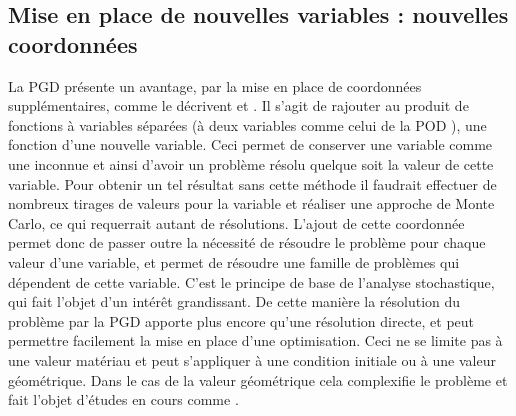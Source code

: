 \documentclass[12pt,a4paper]{report}
\begin{document}
\subsection{Mise en place de nouvelles variables : nouvelles coordonnées}
La PGD présente un avantage, par la mise en place de coordonnées supplémentaires, comme le décrivent \cite{Paradigm} et \cite{DDAS}. Il s'agit de rajouter au produit de fonctions à variables séparées (à deux variables comme celui de la POD \cite{Chatterjee}), une fonction d'une nouvelle variable. Ceci permet de conserver une variable comme une inconnue et ainsi d'avoir un problème résolu quelque soit la valeur de cette variable. Pour obtenir un tel résultat sans cette méthode il faudrait effectuer de nombreux tirages de valeurs pour la variable et réaliser une approche de Monte Carlo, ce qui requerrait autant de résolutions. L'ajout de cette coordonnée permet donc de passer outre la nécessité de résoudre le problème pour chaque valeur d'une variable, et permet de résoudre une famille de problèmes qui dépendent de cette variable. C'est le principe de base de l'analyse stochastique, qui fait l'objet d'un intérêt grandissant. De cette manière la résolution du problème par la PGD apporte plus encore qu'une résolution directe, et peut permettre facilement la mise en place d'une optimisation. Ceci ne se limite pas à une valeur matériau et peut s'appliquer à une condition initiale ou à une valeur géométrique. 
Dans le cas de la valeur géométrique cela complexifie le problème et fait l'objet d'études en cours comme \cite{courard2013abaques,ammar2014parametric}.
\end{document}
